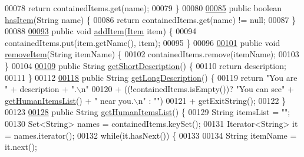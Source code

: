 \begin{DoxyCode}
00078         \textcolor{keywordflow}{return} containedItems.get(name);
00079     \}
00080 
\hypertarget{Room_8java_source_l00085}{}\hyperlink{classRoom_ad779b367b26018c9f343ca3044c4b54f}{00085}     \textcolor{keyword}{public} \textcolor{keywordtype}{boolean} \hyperlink{classRoom_ad779b367b26018c9f343ca3044c4b54f}{hasItem}(String name) \{
00086         \textcolor{keywordflow}{return} containedItems.get(name) != null;
00087     \}
00088 
\hypertarget{Room_8java_source_l00093}{}\hyperlink{classRoom_a0b4fcc1c1c04e60efa7ae5f82ea37157}{00093}     \textcolor{keyword}{public} \textcolor{keywordtype}{void} \hyperlink{classRoom_a0b4fcc1c1c04e60efa7ae5f82ea37157}{addItem}(\hyperlink{classItem}{Item} item) \{
00094         containedItems.put(item.getName(), item);
00095     \}
00096 
\hypertarget{Room_8java_source_l00101}{}\hyperlink{classRoom_a591912d92553130f8f90a5bebd236a5c}{00101}     \textcolor{keyword}{public} \textcolor{keywordtype}{void} \hyperlink{classRoom_a591912d92553130f8f90a5bebd236a5c}{removeItem}(String itemName) \{
00102         containedItems.remove(itemName);
00103     \}
00104 
\hypertarget{Room_8java_source_l00109}{}\hyperlink{classRoom_a85e561bc5fa9d9c965300e9ad264b02a}{00109}     \textcolor{keyword}{public} String \hyperlink{classRoom_a85e561bc5fa9d9c965300e9ad264b02a}{getShortDescription}() \{
00110         \textcolor{keywordflow}{return} description;
00111     \}
00112 
\hypertarget{Room_8java_source_l00118}{}\hyperlink{classRoom_a23a25854d7544fb0b41190a4d6bd1322}{00118}     \textcolor{keyword}{public} String \hyperlink{classRoom_a23a25854d7544fb0b41190a4d6bd1322}{getLongDescription}() \{
00119         \textcolor{keywordflow}{return} \textcolor{stringliteral}{"You are "} + description + \textcolor{stringliteral}{".\(\backslash\)n"}
00120                 + ((!containedItems.isEmpty())? \textcolor{stringliteral}{"You can see"} + 
      \hyperlink{classRoom_ab8a87ad306f77a936873094b479bcde8}{getHumanItemsList}() + \textcolor{stringliteral}{" near you.\(\backslash\)n"} : \textcolor{stringliteral}{""})
00121                 + getExitString();
00122     \}
00123 
\hypertarget{Room_8java_source_l00128}{}\hyperlink{classRoom_ab8a87ad306f77a936873094b479bcde8}{00128}     \textcolor{keyword}{public} String \hyperlink{classRoom_ab8a87ad306f77a936873094b479bcde8}{getHumanItemsList}() \{
00129         String itemsList = \textcolor{stringliteral}{""};
00130         Set<String> names = containedItems.keySet();
00131         Iterator<String> it = names.iterator();
00132         \textcolor{keywordflow}{while}(it.hasNext()) \{
00133 
00134             String itemName = it.next();

\end{DoxyCode}
